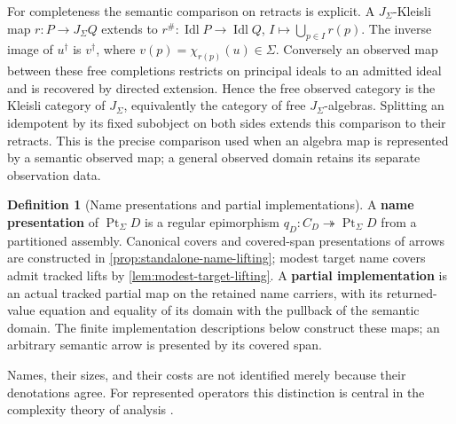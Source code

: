 \documentclass[11pt,a4paper]{article}
\numberwithin{algorithm}{section}
\numberwithin{equation}{section}
\theoremstyle{definition}
\newtheorem{definition}[definition]{Definition}
\theoremstyle{remark}
\theoremstyle{plain}
\newcommand{\Idl}{\operatorname{Idl}}
\newcommand{\Pt}{\operatorname{Pt}_{\Sigma}}
\newcommand{\J}{J_{\Sigma}}
\newcommand{\onto}{\twoheadrightarrow}
\theoremstyle{definition}
\theoremstyle{plain}
\begin{document}
For completeness the semantic comparison on retracts is explicit.
A $\J$-Kleisli map $r:P\to\J Q$ extends to
$r^\#: \Idl P\to\Idl Q$, $I\mapsto\bigcup_{p\in I}r(p)$.
The inverse image of $u^\dagger$ is $v^\dagger$, where
$v(p)=\chi_{r(p)}(u)\in\Sigma$. Conversely an observed map between
these free completions restricts on principal ideals to an admitted
ideal and is recovered by directed extension.
Hence the free observed category is the Kleisli category of $\J$,
equivalently the category of free $\J$-algebras.
Splitting an idempotent by its fixed subobject on both sides extends
this comparison to their retracts. This is the precise comparison
used when an algebra map is represented by a semantic observed map;
a general observed domain retains its separate observation data.


\begin{definition}[Name presentations and partial implementations]\label{def:name-presentations}
A \textbf{name presentation} of $\Pt D$ is a regular epimorphism
$q_D:C_D\onto\Pt D$ from a partitioned assembly. Canonical covers
and covered-span presentations of arrows are constructed in
\cref{prop:standalone-name-lifting}; modest target name covers admit
tracked lifts by \cref{lem:modest-target-lifting}.
A \textbf{partial implementation} is an actual tracked partial map
on the retained name carriers, with its returned-value equation and
equality of its domain with the pullback of the semantic domain.
The finite implementation descriptions below construct these maps;
an arbitrary semantic arrow is presented by its covered span.
\end{definition}

 Names, their sizes, and their costs
are not identified merely because their denotations agree.
For represented operators this distinction is central in the
complexity theory of analysis \citep{KawamuraCook2012Operators}.
\end{document}
